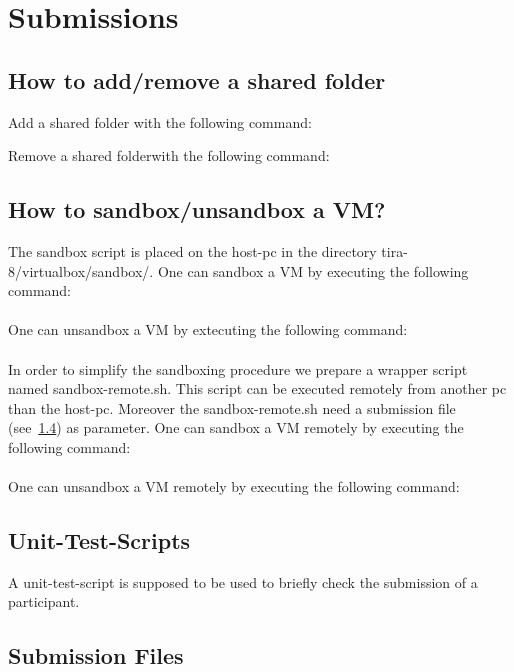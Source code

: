 \chapter{Submissions}

\section{How to add/remove a shared folder}

Add a shared folder with the following command:\\
\medskip\noindent

Remove a shared folderwith the following command:\\

\section{How to sandbox/unsandbox a VM?}\label{sandbox}
The sandbox script is placed on the host-pc in the directory tira-8/virtualbox/sandbox/.
One can sandbox a VM by executing the following command:\\
\\
One can unsandbox a VM by extecuting the following command:\\
\\
\medskip\noindent
In order to simplify the sandboxing procedure we prepare a wrapper script named sandbox-remote.sh. This script can be executed remotely from another pc than the host-pc. 
Moreover the sandbox-remote.sh need a submission file (see~\ref{submission-file}) as parameter. 
One can sandbox a VM remotely by executing the following command:\\
\\
One can unsandbox a VM remotely by executing the following command:\\

\section{Unit-Test-Scripts}
A unit-test-script is supposed to be used to briefly check the submission of a participant. 


\section{Submission Files}\label{submission-file}



